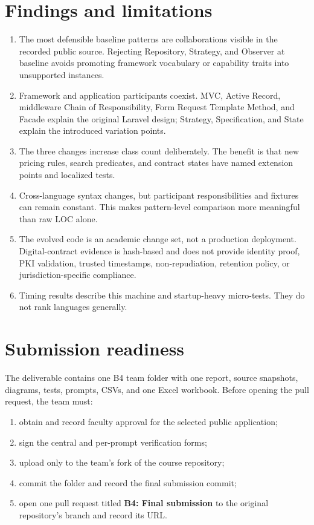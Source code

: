 \documentclass[11pt,a4paper]{article}
\newcommand{\codepath}[1]{\path{#1}}
\begin{document}
\section{Findings and limitations}

\begin{enumerate}[leftmargin=*]
\item The most defensible baseline patterns are collaborations visible in the recorded public source. Rejecting Repository, Strategy, and Observer at baseline avoids promoting framework vocabulary or capability traits into unsupported instances.
\item Framework and application participants coexist. MVC, Active Record, middleware Chain of Responsibility, Form Request Template Method, and Facade explain the original Laravel design; Strategy, Specification, and State explain the introduced variation points.
\item The three changes increase class count deliberately. The benefit is that new pricing rules, search predicates, and contract states have named extension points and localized tests.
\item Cross-language syntax changes, but participant responsibilities and fixtures can remain constant. This makes pattern-level comparison more meaningful than raw LOC alone.
\item The evolved code is an academic change set, not a production deployment. Digital-contract evidence is hash-based and does not provide identity proof, PKI validation, trusted timestamps, non-repudiation, retention policy, or jurisdiction-specific compliance.
\item Timing results describe this machine and startup-heavy micro-tests. They do not rank languages generally.
\end{enumerate}

\section{Submission readiness}

The deliverable contains one B4 team folder with one report, source snapshots, diagrams, tests, prompts, CSVs, and one Excel workbook. Before opening the pull request, the team must:

\begin{enumerate}[leftmargin=*]
\item obtain and record faculty approval for the selected public application;
\item sign the central and per-prompt verification forms;
\item upload only \codepath{B4/} to the team's fork of the course repository;
\item commit the folder and record the final submission commit;
\item open one pull request titled \textbf{B4: Final submission} to the original repository's \codepath{main} branch and record its URL.
\end{enumerate}
\end{document}
